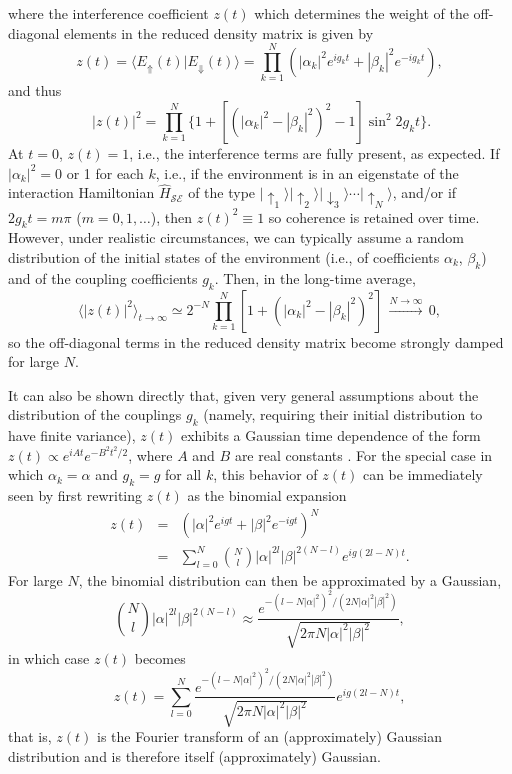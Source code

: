 \documentclass[twocolumn,rmp,aps,amsmath,amsfonts,noshowkeys,noshowpacs]{revtex4}
\newcommand{\ket}[1]{\ensuremath{|{#1\rangle}}}
\begin{document}
%
where the interference coefficient $z(t)$ which determines the weight
of the off-diagonal elements in the reduced density matrix is given by
%
\begin{equation} 
z(t) = \langle E_{\Uparrow}(t) | E_{\Downarrow}(t) \rangle 
=\prod_{k=1}^N (|\alpha_k|^2 e^{ig_kt} + |\beta_k|^2 e^{-ig_kt} ),
\end{equation} 
%
and thus
%
\begin{equation} \
|z(t)|^2 = \prod_{k=1}^N \{ 1 + [(|\alpha_k|^2 - |\beta_k|^2)^2
-1] \sin^2 2g_kt \}. 
\end{equation} 
%
At $t=0$, $z(t)=1$, i.e., the interference terms are fully present, as
expected. If $|\alpha_k|^2=0$ or 1 for each $k$, i.e., if the
environment is in an eigenstate of the interaction Hamiltonian
$\widehat{H}_\mathcal{SE}$ of the type $\ket{\uparrow_1} \ket{\uparrow_2}
\ket{\downarrow_3} \cdots \ket{\uparrow_N}$, and/or if $2g_kt = m\pi$
($m=0,1,\hdots$), then $z(t)^2 \equiv 1$ so coherence is retained over
time.  However, under realistic circumstances, we can typically assume
a random distribution of the initial states of the environment (i.e., of
coefficients $\alpha_k$, $\beta_k$) and of the coupling coefficients
$g_k$. Then, in the long-time average, 
%
\begin{equation}
\langle |z(t)|^2 \rangle_{t \rightarrow \infty} 
\simeq 2^{-N} \prod_{k=1}^N [1 + (|\alpha_k|^2 -
|\beta_k|^2)^2] \, \stackrel{N\rightarrow \infty}{\longrightarrow} \, 0,
\end{equation} 
%
so the off-diagonal terms in the reduced density matrix become
strongly damped for large $N$. 

It can also be shown directly that, given very general assumptions
about the distribution of the couplings $g_k$ (namely, requiring their
initial distribution to have finite variance), $z(t)$ exhibits a
Gaussian time dependence of the form $z(t) \propto e^{iAt}
e^{-B^2t^2/2}$, where $A$ and $B$ are real constants
\citep{Zurek:2003:om}. For the special case in which $\alpha_k=\alpha$
and $g_k=g$ for all $k$, this behavior of $z(t)$ can be immediately
seen by first rewriting $z(t)$ as the binomial expansion
%
\begin{eqnarray} 
z(t) &=& (|\alpha|^2 e^{igt} + |\beta|^2 e^{-igt} )^N \nonumber \\ &=& \sum_{l=0}^N
\binom{N}{l} |\alpha|^{2l} |\beta|^{2(N-l)} e^{ig(2l-N)t}.
\end{eqnarray} 
%
For large $N$, the binomial distribution can then be approximated by a
Gaussian,
%
\begin{equation}
\binom{N}{l} |\alpha|^{2l} |\beta|^{2(N-l)} \approx
\frac{e^{-(l-N|\alpha|^2)^2/(2N|\alpha|^2 |\beta|^2)}}{\sqrt{2\pi N |\alpha|^2 |\beta|^2}},
\end{equation} 
%
in which case $z(t)$ becomes
%
\begin{equation}
z(t) = \sum_{l=0}^N \frac{e^{-(l-N|\alpha|^2)^2/(2N|\alpha|^2
 |\beta|^2)}}{\sqrt{2\pi N |\alpha|^2 |\beta|^2}} 
 e^{ig(2l-N)t}, 
\end{equation} 
%
that is, $z(t)$ is the Fourier transform of an (approximately) Gaussian
distribution and is therefore itself (approximately) Gaussian.
\end{document}
